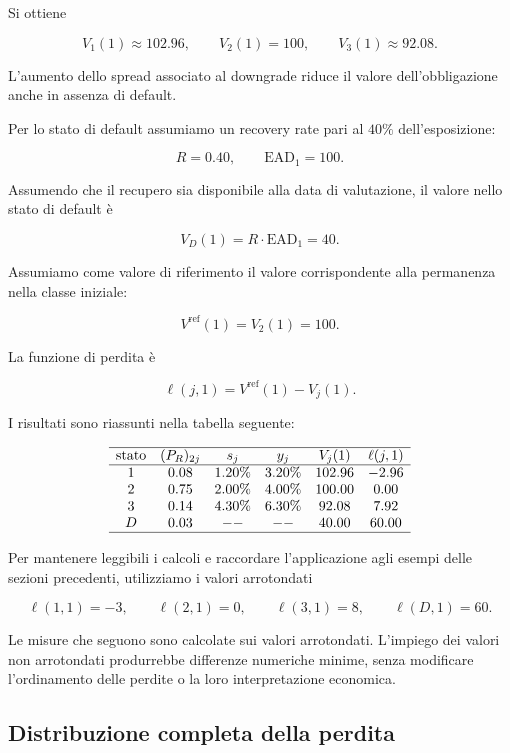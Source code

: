 Si ottiene

\[
V_1(1)\approx102.96,
\qquad
V_2(1)=100,
\qquad
V_3(1)\approx92.08.
\]

L'aumento dello spread associato al downgrade riduce il valore
dell'obbligazione anche in assenza di default.

Per lo stato di default assumiamo un recovery rate pari al $40\%$
dell'esposizione:

\[
R=0.40,
\qquad
\mathrm{EAD}_1=100.
\]

Assumendo che il recupero sia disponibile alla data di valutazione, il
valore nello stato di default \`{e}

\[
V_D(1)
=
R \cdot \mathrm{EAD}_1
=
40.
\]

Assumiamo come valore di riferimento il valore corrispondente alla
permanenza nella classe iniziale:

\[
V^{\mathrm{ref}}(1)
=
V_2(1)
=
100.
\]

La funzione di perdita \`{e}

\[
\ell(j,1)
=
V^{\mathrm{ref}}(1)-V_j(1).
\]

I risultati sono riassunti nella tabella seguente:

\[
\begin{array}{cccccc}
\hline
\text{stato}
&
(P_R)_{2j}
&
s_j
&
y_j
&
V_j(1)
&
\ell(j,1)
\\
\hline
1
&
0.08
&
1.20\%
&
3.20\%
&
102.96
&
-2.96
\\
2
&
0.75
&
2.00\%
&
4.00\%
&
100.00
&
0.00
\\
3
&
0.14
&
4.30\%
&
6.30\%
&
92.08
&
7.92
\\
D
&
0.03
&
--
&
--
&
40.00
&
60.00
\\
\hline
\end{array}
\]

Per mantenere leggibili i calcoli e raccordare l'applicazione agli
esempi delle sezioni precedenti, utilizziamo i valori arrotondati

\[
\ell(1,1)=-3,
\qquad
\ell(2,1)=0,
\qquad
\ell(3,1)=8,
\qquad
\ell(D,1)=60.
\]

Le misure che seguono sono calcolate sui valori arrotondati. L'impiego
dei valori non arrotondati produrrebbe differenze numeriche minime,
senza modificare l'ordinamento delle perdite o la loro interpretazione
economica.

\subsection{Distribuzione completa della perdita}

